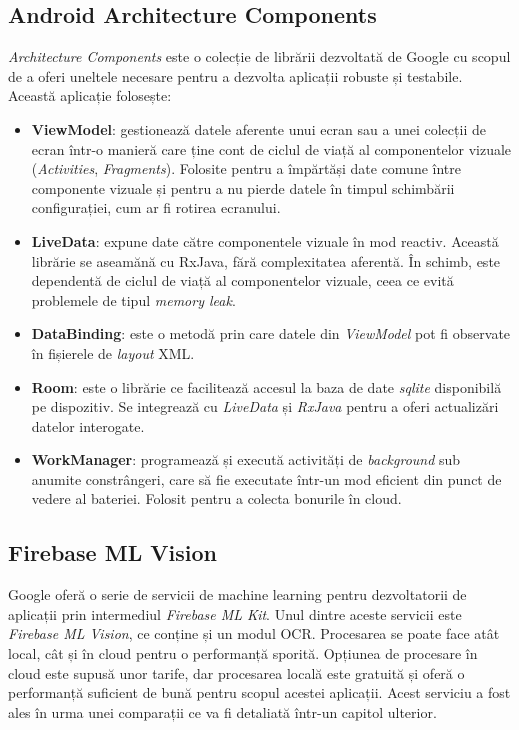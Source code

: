 \subsection{Android Architecture Components}

\emph{Architecture Components} este o colecție de librării dezvoltată de Google cu scopul de a oferi uneltele necesare pentru a dezvolta aplicații robuste și testabile. Această aplicație folosește:

\begin{itemize}
\item
  \textbf{ViewModel}: gestionează datele aferente unui ecran sau a unei colecții de ecran într-o manieră care ține cont de ciclul de viață al componentelor vizuale (\emph{Activities}, \emph{Fragments}). Folosite pentru a împărtăși date comune între componente vizuale și pentru a nu pierde datele în timpul schimbării configurației, cum ar fi rotirea ecranului.
\item
  \textbf{LiveData}: expune date către componentele vizuale în mod reactiv. Această librărie se aseamănă cu RxJava, fără complexitatea aferentă. În schimb, este dependentă de ciclul de viață al componentelor vizuale, ceea ce evită problemele de tipul \emph{memory leak}.
\item
  \textbf{DataBinding}: este o metodă prin care datele din \emph{ViewModel} pot fi observate în fișierele de \emph{layout} XML.
\item
  \textbf{Room}: este o librărie ce facilitează accesul la baza de date
  \emph{sqlite} disponibilă pe dispozitiv. Se integrează cu
  \emph{LiveData} și \emph{RxJava} pentru a oferi actualizări datelor interogate.
\item
  \textbf{WorkManager}: programează și execută activități de
  \emph{background} sub anumite constrângeri, care să fie executate într-un mod eficient din punct de vedere al bateriei. Folosit pentru a colecta bonurile în cloud.
\end{itemize}

\subsection{Firebase ML Vision}

Google oferă o serie de servicii de machine learning pentru dezvoltatorii de aplicații prin intermediul \emph{Firebase ML Kit}. Unul dintre aceste servicii este \emph{Firebase ML Vision}, ce conține și un modul OCR. Procesarea se poate face atât local, cât și în cloud pentru o performanță sporită. Opțiunea de procesare în cloud este supusă unor tarife, dar procesarea locală este gratuită și oferă o performanță suficient de bună pentru scopul acestei aplicații. Acest serviciu a fost ales în urma unei comparații ce va fi detaliată într-un capitol ulterior.

